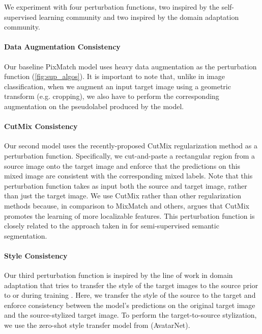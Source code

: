 \documentclass[final]{cvpr}
\begin{document}
We experiment with four perturbation functions, two inspired by the self-supervised learning community and two inspired by the domain adaptation community. 

\paragraph{Data Augmentation Consistency} Our baseline PixMatch model uses heavy data augmentation as the perturbation function (\autoref{fig:sup_algos}). It is important to note that, unlike in image classification, when we augment an input target image using a geometric transform (e.g. cropping), we also have to perform the corresponding augmentation on the pseudolabel produced by the model. 

\paragraph{CutMix Consistency} Our second model uses the recently-proposed CutMix \cite{yun2019cutmix} regularization method as a perturbation function. Specifically, we cut-and-paste a rectangular region from a source image onto the target image and enforce that the predictions on this mixed image are consistent with the corresponding mixed labels. Note that this perturbation function takes as input both the source and target image, rather than just the target image. We use CutMix rather than other regularization methods because, in comparison to MixMatch \cite{berthelot2019mixmatch} and others, \cite{yun2019cutmix} argues that CutMix promotes the learning of more localizable features. 
This perturbation function is closely related to the approach taken in \cite{cutmix_for_ssss} for semi-supervised semantic segmentation.

\paragraph{Style Consistency} Our third perturbation function is inspired by the line of work in domain adaptation that tries to transfer the style of the target images to the source prior to or during training \cite{cycada,adaptsegnet,chen2019crdoco,murez2018image}. Here, we transfer the style of the source to the target and enforce consistency between the model's predictions on the original target image and the source-stylized target image. To perform the target-to-source stylization, we use the zero-shot style transfer model from \cite{sheng2018avatar} (AvatarNet). 
\end{document}
